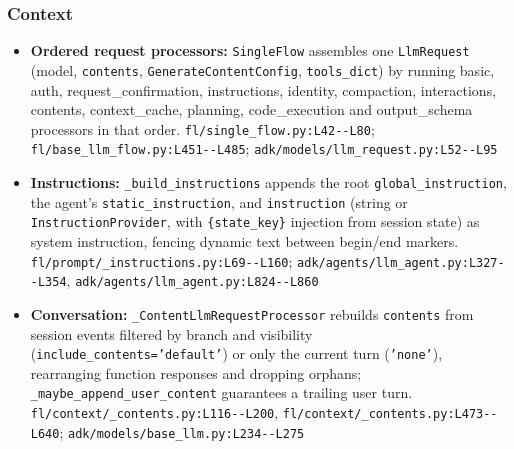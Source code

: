 \subsubsection*{Context}
\begin{itemize}
\item \textbf{Ordered request processors:} \texttt{SingleFlow} assembles one \texttt{LlmRequest} (model, \texttt{contents}, \texttt{GenerateContentConfig}, \texttt{tools\_\allowbreak{}dict}) by running basic, auth, request\_confirmation, instructions, identity, compaction, interactions, contents, context\_cache, planning, code\_execution and output\_schema processors in that order. \texttt{fl/\allowbreak{}single\_\allowbreak{}flow.\allowbreak{}py:\allowbreak{}L42-\allowbreak{}-\allowbreak{}L80}; \texttt{fl/\allowbreak{}base\_\allowbreak{}llm\_\allowbreak{}flow.\allowbreak{}py:\allowbreak{}L451-\allowbreak{}-\allowbreak{}L485}; \texttt{adk/\allowbreak{}models/\allowbreak{}llm\_\allowbreak{}request.\allowbreak{}py:\allowbreak{}L52-\allowbreak{}-\allowbreak{}L95}
\item \textbf{Instructions:} \texttt{\_\allowbreak{}build\_\allowbreak{}instructions} appends the root \texttt{global\_\allowbreak{}instruction}, the agent's \texttt{static\_\allowbreak{}instruction}, and \texttt{instruction} (string or \texttt{InstructionProvider}, with \texttt{\{state\_\allowbreak{}key\}} injection from session state) as system instruction, fencing dynamic text between begin/end markers. \texttt{fl/\allowbreak{}prompt/\allowbreak{}\_\allowbreak{}instructions.\allowbreak{}py:\allowbreak{}L69-\allowbreak{}-\allowbreak{}L160}; \texttt{adk/\allowbreak{}agents/\allowbreak{}llm\_\allowbreak{}agent.\allowbreak{}py:\allowbreak{}L327-\allowbreak{}-\allowbreak{}L354}, \texttt{adk/\allowbreak{}agents/\allowbreak{}llm\_\allowbreak{}agent.\allowbreak{}py:\allowbreak{}L824-\allowbreak{}-\allowbreak{}L860}
\item \textbf{Conversation:} \texttt{\_\allowbreak{}ContentLlmRequestProcessor} rebuilds \texttt{contents} from session events filtered by branch and visibility (\texttt{include\_\allowbreak{}contents='default'}) or only the current turn (\texttt{'none'}), rearranging function responses and dropping orphans; \texttt{\_\allowbreak{}maybe\_\allowbreak{}append\_\allowbreak{}user\_\allowbreak{}content} guarantees a trailing user turn. \texttt{fl/\allowbreak{}context/\allowbreak{}\_\allowbreak{}contents.\allowbreak{}py:\allowbreak{}L116-\allowbreak{}-\allowbreak{}L200}, \texttt{fl/\allowbreak{}context/\allowbreak{}\_\allowbreak{}contents.\allowbreak{}py:\allowbreak{}L473-\allowbreak{}-\allowbreak{}L640}; \texttt{adk/\allowbreak{}models/\allowbreak{}base\_\allowbreak{}llm.\allowbreak{}py:\allowbreak{}L234-\allowbreak{}-\allowbreak{}L275}

\end{itemize}
